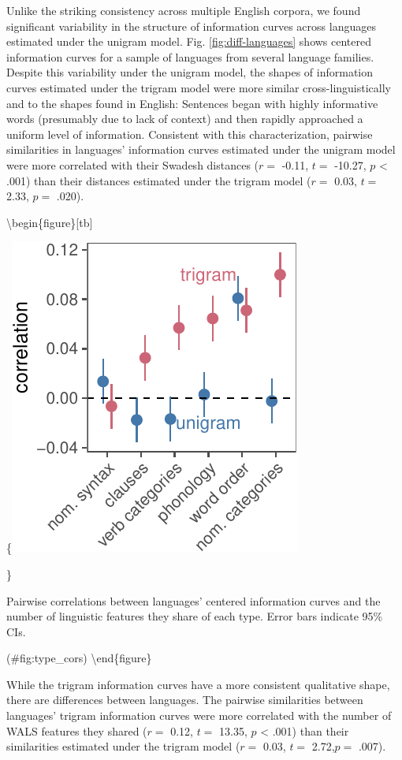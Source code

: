 \documentclass[man,floatsintext]{apa6}
\begin{document}
Unlike the striking consistency across multiple English corpora, we found significant variability in the structure of information curves across languages estimated under the unigram model. Fig. \ref{fig:diff-languages} shows centered information curves for a sample of languages from several language families. Despite this variability under the unigram model, the shapes of information curves estimated under the trigram model were more similar cross-linguistically and to the shapes found in English: Sentences began with highly informative words (presumably due to lack of context) and then rapidly approached a uniform level of information. Consistent with this characterization, pairwise similarities in languages' information curves estimated under the unigram model were more correlated with their Swadesh distances (\(r =\) -0.11, \(t =\) -10.27, \(p\) \textless{} .001) than their distances estimated under the trigram model (\(r =\) 0.03, \(t =\) 2.33, \(p =\) .020).

\textbackslash{}begin\{figure\}{[}tb{]}

\{\centering \includegraphics{figs/type_cors-1}

\}

\caption{Pairwise correlations between languages' centered information curves and the number of linguistic features they share of each type. Error bars indicate 95\% CIs.}

(\#fig:type\_cors)
\textbackslash{}end\{figure\}

While the trigram information curves have a more consistent qualitative shape, there are differences between languages. The pairwise similarities between languages' trigram information curves were more correlated with the number of WALS features they shared (\(r =\) 0.12, \(t =\) 13.35, \(p\) \textless{} .001) than their similarities estimated under the trigram model (\(r =\) 0.03, \(t =\) 2.72,\(p =\) .007).
\end{document}
